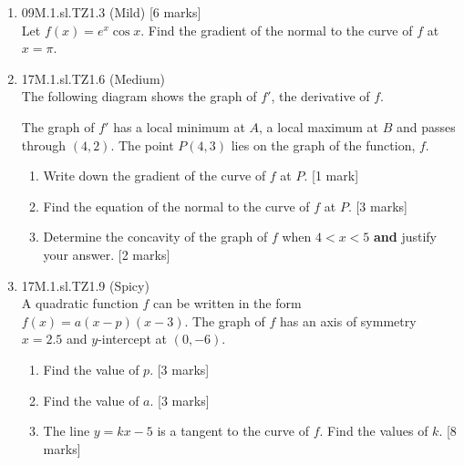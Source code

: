 \documentclass[12pt, twoside]{article}
\begin{document}
\begin{enumerate}
  \item 09M.1.sl.TZ1.3 (Mild) [6 marks]\\
  Let $f(x)=e^{x} \cos x$. Find the gradient of the normal to the curve of $f$ at $x= \pi$.

  \item 17M.1.sl.TZ1.6 (Medium)\\
  The following diagram shows the graph of $f'$, the derivative of $f$.
    \begin{center}
    \end{center}
    The graph of $f'$ has a local minimum at $A$, a local maximum at $B$ and passes through $(4,2)$. The point $P(4,3)$ lies on the graph of the function, $f$.
    \begin{enumerate}
      \item Write down the gradient of the curve of $f$ at $P$. [1 mark]
      \item Find the equation of the normal to the curve of $f$ at $P$. [3 marks]
      \item Determine the concavity of the graph of $f$ when $4<x<5$ \textbf{and} justify your answer. [2 marks]
    \end{enumerate}

    \item 17M.1.sl.TZ1.9 (Spicy)\\
    A quadratic function $f$ can be written in the form  $f(x)=a(x-p)(x-3)$. The graph of $f$ has an axis of symmetry $x=2.5$ and $y$-intercept at $(0,-6)$.
    \begin{enumerate}
      \item Find the value of $p$. [3 marks]
      \item Find the value of $a$. [3 marks]
      \item The line $y=kx-5$ is a tangent to the curve of $f$. Find the values of $k$. [8 marks]
    \end{enumerate}



\end{enumerate}
\end{document}
